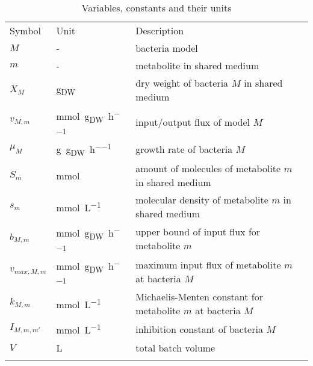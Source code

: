 \section{}
\begin{table*}[H]
\centering
\caption{Variables, constants and their units}
\label{tab:units_of_variables_and_constants}
\begin{tabular}{lll}
\rowcolor[HTML]{EFEFEF} 
Symbol                 & Unit    & Description\\
$M$                    & -       & bacteria model\\
$m$                    & -       & metabolite in shared medium\\
$X_M$                  & \si{\gram_{DW}} & dry weight of bacteria $M$ in shared medium\\
$v_{M,m}$              & \si{\milli\mole\per\gram_{DW}\per\hour} & input/output flux of model $M$\\
$\mu_M$                & \si{\gram\per\gram_{DW}\per\hour} & growth rate of bacteria $M$\\
$S_m$                  & \si{\milli\mole} & amount of molecules of metabolite $m$ in shared medium\\
$s_m$                  & \si{\milli\mole\per\liter} & molecular density of metabolite $m$ in shared medium\\
$b_{M,m}$              & \si{\milli\mole\per\gram_{DW}\per\hour} & upper bound of input flux for metabolite $m$\\
$v_{max,M,m}$          & \si{\milli\mole\per\gram_{DW}\per\hour} & maximum input flux of metabolite $m$ at bacteria $M$\\
$k_{M,m}$              & \si{\milli\mole\per\liter} & Michaelis-Menten constant for metabolite $m$ at bacteria $M$\\
$I_{M,m,m'}$           & \si{\milli\mole\per\liter} & inhibition constant of bacteria $M$\\
$V$                    & \si{\liter} & total batch volume\\
 &&\\

\end{tabular}
\end{table*}

